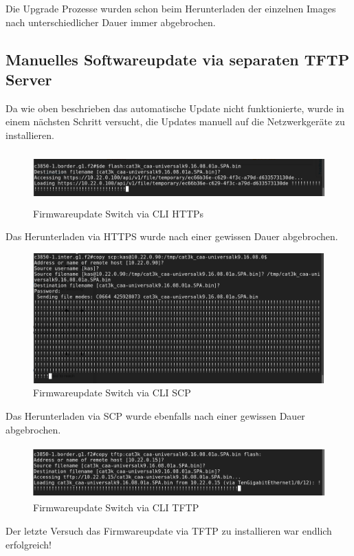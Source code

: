 Die Upgrade Prozesse wurden schon beim Herunterladen der einzelnen Images nach unterschiedlicher Dauer immer abgebrochen.

\subsection{Manuelles Softwareupdate via separaten TFTP Server}
Da wie oben beschrieben das automatische Update nicht funktionierte, wurde in einem nächsten Schritt versucht, die Updates manuell auf die Netzwerkgeräte zu installieren. 

\begin{figure}[H]
	\centering
	\includegraphics[height=2cm]{img/updates/Selection_082.png}
	\caption{Firmwareupdate Switch via CLI HTTPs}
	\label{fig:dna-center-provision-updates-2}
\end{figure}
Das Herunterladen via HTTPS wurde nach einer gewissen Dauer abgebrochen.

\begin{figure}[H]
	\centering
	\includegraphics[height=5cm]{img/updates/Selection_108.png}
	\caption{Firmwareupdate Switch via CLI SCP}
	\label{fig:dna-center-provision-updates-3}
\end{figure}
Das Herunterladen via SCP wurde ebenfalls nach einer gewissen Dauer abgebrochen.

\begin{figure}[H]
	\centering
	\includegraphics[height=2cm]{img/updates/Selection_111.png}
	\caption{Firmwareupdate Switch via CLI TFTP}
	\label{fig:dna-center-provision-updates-4}
\end{figure}
Der letzte Versuch das Firmwareupdate via TFTP zu installieren war endlich erfolgreich!

